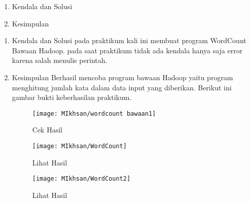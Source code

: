 \begin{enumerate}
\item Kendala dan Solusi


\item Kesimpulan

\end{enumerate}

\begin{enumerate}
\item Kendala dan Solusi
\newline pada praktikum kali ini membuat program WordCount Bawaan Hadoop. pada saat praktikum tidak ada kendala hanya saja error karena salah menulis perintah.

\item Kesimpulan
Berhasil mencoba program bawaan Hadoop yaitu program menghitung jumlah kata dalam data input yang diberikan. Berikut ini gambar bukti keberhasilan praktikum.

\begin{figure}[!ht]
\texttt{[image: MIkhsan/wordcount bawaan1]}
\caption{Cek Hasil}
\label{gam:Hadoop-version(MIkhsan)}
\end{figure}

\begin{figure}[!ht]
\texttt{[image: MIkhsan/WordCount]}
\caption{Lihat Hasil}
\label{gam:Hadoop-version(MIkhsan)}
\end{figure}
\begin{figure}[!ht]
\texttt{[image: MIkhsan/WordCount2]}
\caption{Lihat Hasil}
\label{gam:Hadoop-version(MIkhsan)}
\end{figure}
\end{enumerate}


